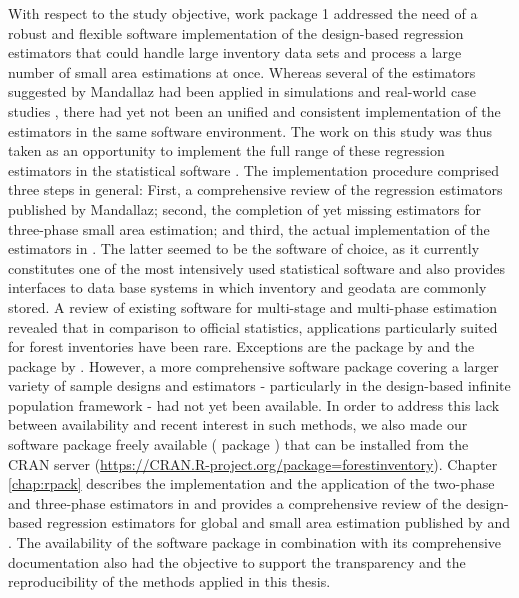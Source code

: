 With respect to the study objective, work package 1 addressed the need of a robust and flexible software implementation of the design-based regression estimators that could handle large inventory data sets and process a large number of small area estimations at once. Whereas several of the estimators suggested by Mandallaz had been applied in simulations and real-world case studies \citep{mandallaz2013a, mandallaz2013b, mandallaz2013c, massey2014a, massey2015a, massey2015b}, there had yet not been an unified and consistent implementation of the estimators in the same software environment. The work on this study was thus taken as an opportunity to implement the full range of these regression estimators in the statistical software  \citep{R}. The implementation procedure comprised three steps in general: First, a comprehensive review of the regression estimators published by Mandallaz; second, the completion of yet missing estimators for three-phase small area estimation; and third, the actual implementation of the estimators in . The latter seemed to be the software of choice, as it currently constitutes one of the most intensively used statistical software and also provides interfaces to data base systems in which inventory and geodata are commonly stored. A review of existing software for multi-stage and multi-phase estimation revealed that in comparison to official statistics, applications particularly suited for forest inventories have been rare. Exceptions are the  package  by \citet{josae2015} and the  package by \citet{cullmann2016}. However, a more comprehensive software package covering a larger variety of sample designs and estimators - particularly in the design-based infinite population framework - had not yet been available. In order to address this lack between availability and recent interest in such methods, we also made our software package freely available ( package ) that can be installed from the CRAN server (\url{https://CRAN.R-project.org/package=forestinventory}). Chapter \ref{chap:rpack} describes the implementation and the application of the two-phase and three-phase estimators in  and provides a comprehensive review of the design-based regression estimators for global and small area estimation published by \citet{mandallaz2008, mandallaz2013a, mandallaz2013c} and \citet{mandallaz2013b}. The availability of the software package in combination with its comprehensive documentation also had the objective to support the transparency and the reproducibility of the methods applied in this thesis.


